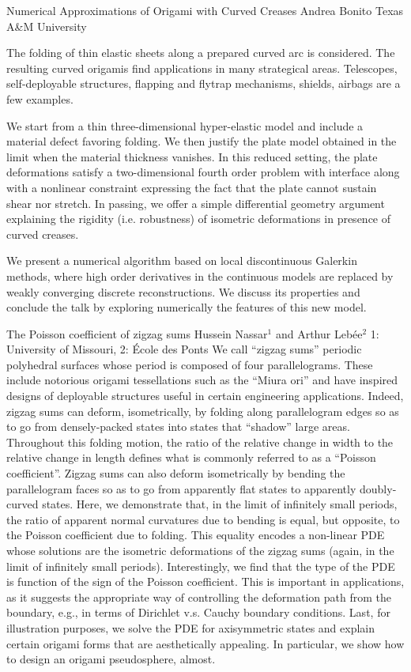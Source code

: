 \vspace{1.5ex}
\abs
{Numerical Approximations of Origami with Curved Creases}
{Andrea Bonito}
{Texas A\&M University}
{The folding of thin elastic sheets along a prepared curved arc is considered.  The resulting curved origamis find applications in many strategical areas. Telescopes, self-deployable structures, flapping and flytrap mechanisms, shields, airbags are a few examples.

We start from a thin three-dimensional hyper-elastic model and include a material defect favoring folding. We then justify the plate model obtained in the limit when the material thickness vanishes. In this reduced setting, the plate deformations satisfy a two-dimensional fourth order problem with interface along with a nonlinear constraint expressing the fact that the plate cannot sustain shear nor stretch.
In passing, we offer a simple differential geometry argument explaining the rigidity (i.e. robustness) of isometric deformations in presence of curved creases.

We present a numerical algorithm based on local discontinuous Galerkin methods, where high order derivatives in the continuous models are replaced by weakly converging discrete reconstructions. We discuss its properties and conclude the talk by exploring numerically the features of this new model.}


\vspace{1.5ex}
\abs
{The Poisson coefficient of zigzag sums}
{Hussein Nassar$^{1}$ and Arthur Leb\'ee$^{2}$}
{1: University of Missouri, 2: \'Ecole des Ponts}
{We call ``zigzag sums'' periodic polyhedral surfaces whose period is composed of four parallelograms. These include notorious origami tessellations such as the ``Miura ori'' and have inspired designs of deployable structures useful in certain engineering applications. Indeed, zigzag sums can deform, isometrically, by folding along parallelogram edges so as to go from densely-packed states into states that ``shadow'' large areas. Throughout this folding motion, the ratio of the relative change in width to the relative change in length defines what is commonly referred to as a ``Poisson coefficient''. Zigzag sums can also deform isometrically by bending the parallelogram faces so as to go from apparently flat states to apparently doubly-curved states. Here, we demonstrate that, in the limit of infinitely small periods, the ratio of apparent normal curvatures due to bending is equal, but opposite, to the Poisson coefficient due to folding. This equality encodes a non-linear PDE whose solutions are the isometric deformations of the zigzag sums (again, in the limit of infinitely small periods). Interestingly, we find that the type of the PDE is function of the sign of the Poisson coefficient. This is important in applications, as it suggests the appropriate way of controlling the deformation path from the boundary, e.g., in terms of Dirichlet v.s. Cauchy boundary conditions. Last, for illustration purposes, we solve the PDE for axisymmetric states and explain certain origami forms that are aesthetically appealing. In particular, we show how to design an origami pseudosphere, almost.
}


